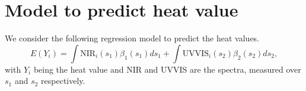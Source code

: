 \documentclass{article}\usepackage[]{graphicx}\usepackage[]{color}
\begin{document}


\section{Model to predict heat value}

We consider the following regression model to predict the heat values.
\[ 
E(Y_i) = \int \mbox{NIR}_i(s_1)\beta_1(s_1)ds_1 + \int \mbox{UVVIS}_i(s_2)\beta_2(s_2)ds_2,
\]
with $Y_i$ being the heat value and NIR and UVVIS are the spectra, measured over $s_1$ and $s_2$ respectively. 
\end{document}
